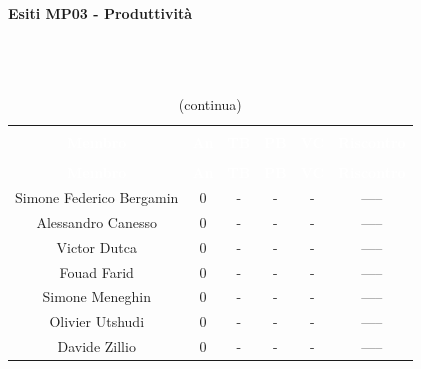 \paragraph{Esiti MP03 - Produttività} \mbox{} \\ \mbox{} \\
\begin{longtable}{c c c c c c}
\rowcolor{white}\caption{Esiti della Produttività} \\
		\rowcolor{redafk}
\textcolor{white}{\textbf{Membro}} &
\textcolor{white}{\textbf{An}} &
\textcolor{white}{\textbf{TB}} &
\textcolor{white}{\textbf{PB}} &
\textcolor{white}{\textbf{VC}} &
\textcolor{white}{\textbf{Riscontro}} \\
		\endfirsthead
		\rowcolor{white}\caption[]{(continua)} \\
		\rowcolor{redafk}
		\textcolor{white}{\textbf{Membro}} &
\textcolor{white}{\textbf{An}} &
\textcolor{white}{\textbf{TB}} &
\textcolor{white}{\textbf{PB}} &
\textcolor{white}{\textbf{VC}} &
\textcolor{white}{\textbf{Riscontro}} \\
		\endhead
Simone Federico Bergamin & 0 & - & - & - & ----- \\
Alessandro Canesso & 0 & - & - & - & ----- \\
Victor Dutca & 0 & - & - & - & ----- \\
Fouad Farid & 0 & - & - & - & ----- \\
Simone Meneghin & 0 & - & - & - & ----- \\
Olivier Utshudi & 0 & - & - & - & ----- \\
Davide Zillio & 0 & - & - & - & ----- \\
\end{longtable}